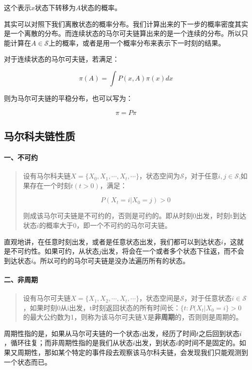这个表示\(x\)状态下转移为\(A\)状态的概率。

其实可以对照下我们离散状态的概率分布。我们计算出来的下一步的概率密度其实是一个离散的分布。而连续状态的马尔可夫链算出来的是一个连续的分布。所以只能计算在\(A\in \mathcal{S}\)上的概率，或者是用一个概率分布来表示下一时刻的结果。

对于连续状态的马尔可夫链，若满足：

\[\pi (A)=\int P(x,A)\pi(x)dx\]

则为马尔可夫链的平稳分布，也可以写为：

\[\pi = P\pi\]
\subsection{马尔科夫链性质}

\hypertarget{ux4e00ux4e0dux53efux7ea6}{%
\paragraph{一、不可约}\label{ux4e00ux4e0dux53efux7ea6}}

\begin{quote}
设有马尔科夫链\(X = \{X_0,X_1,\cdots,X_t,\cdots\}\)，状态空间为\(\mathcal{S}\)，对于任意\(i,j \in \mathcal{S}\),如果存在一个时刻\(t(t>0)\)，满足：

\[P(X_t = i|X_0 = j)>0\]

则成该马尔可夫链是不可约的，否则是可约的。即从时刻0出发，时刻t到达状态\(i\)的概率大于0，即一个不可约的马尔可夫链。
\end{quote}

直观地讲，在任意时刻出发，或者是任意状态出发，我们都可以到达状态\(i\)，这就是不可约性。如果可约，从状态\(j\)出发，将会在一个或者多个状态下往返，而不会到达状态\(i\)。所以可约的马尔可夫链是没办法遍历所有的状态。

\hypertarget{ux4e8cux975eux5468ux671f}{%
\paragraph{二、非周期}\label{ux4e8cux975eux5468ux671f}}

\begin{quote}
设有马尔可夫链\(X=\{X_1,X_2,\cdots,X_t,\cdots\}\)，状态空间是\(\mathcal{S}\)，对于任意状态\(i\in \mathcal{S}\)，如果时刻0从i出发，t时刻返回状态的所有时间长：\(\{t:P(X_t|X_0=i\}>0\)的最大公约数为1，则称为该马尔可夫链\(X\)是\textbf{非周期}的，否则则是周期的。
\end{quote}

周期性指的是，如果从马尔可夫链的一个状态\(i\)出发，经历了时间\(t\)之后回到状态\(i\)，循环往复；而非周期性指的是我们从状态\(i\)出发，到状态\(i\)的时间不是固定的。如果又周期性，那如某个特定的事件段去观察该马尔科夫链，会发现我们只能观测到一个状态而已。

